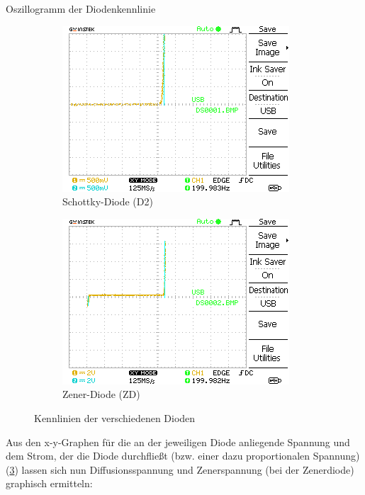 \documentclass{article}
\theoremstyle{definition}
\begin{document}
\begin{aufgabe}{Oszillogramm der Diodenkennlinie}
\begin{figure}[H]
        \hfill
        \begin{subfigure}[b]{0.45 \textwidth}
            \includegraphics[width=\textwidth]{MesswerteVersuch2/m2_1.png}
            \caption{Schottky-Diode (D2)}
            \label{a2_1}
        \end{subfigure}
        \hfill
        \begin{subfigure}[b]{0.45 \textwidth}
            \includegraphics[width=\textwidth]{MesswerteVersuch2/m2_2.png}
            \caption{Zener-Diode (ZD)}
            \label{a2_2}
        \end{subfigure}
        \caption{Kennlinien der verschiedenen Dioden}
        \label{a2}
    \end{figure}
    \auswertung
    Aus den x-y-Graphen für die an der jeweiligen Diode anliegende Spannung und dem Strom, der die Diode durchfließt (bzw. einer dazu proportionalen Spannung)(\ref{a2}) lassen sich nun Diffusionsspannung und Zenerspannung (bei der Zenerdiode) graphisch ermitteln:

\end{aufgabe}
\end{document}
